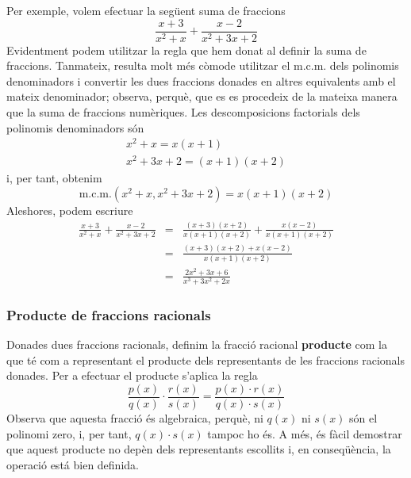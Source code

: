 Per exemple, volem efectuar la següent suma de fraccions\begin{equation*}
\frac{x+3}{x^{2}+x}+\frac{x-2}{x^{2}+3x+2}
\end{equation*}Evidentment podem utilitzar la regla que hem donat al definir la suma de
fraccions. Tanmateix, resulta molt més còmode utilitzar el m.c.m.
dels polinomis denominadors i convertir les dues fraccions donades en
altres equivalents amb el mateix denominador; observa, perquè, que es
es procedeix de la mateixa manera que la suma de fraccions numèriques. Les
descomposicions factorials dels polinomis denominadors són\begin{equation*}
\begin{array}{l}
x^{2}+x=x(x+1) \\
x^{2}+3x+2=(x+1)(x+2)\end{array}\end{equation*}i, per tant, obtenim\begin{equation*}
\text{m.c.m.}\left( x^{2}+x,x^{2}+3x+2\right) =x(x+1)(x+2)
\end{equation*}Aleshores, podem escriure\begin{eqnarray*}
\frac{x+3}{x^{2}+x}+\frac{x-2}{x^{2}+3x+2} &=&\frac{(x+3)(x+2)}{x(x+1)(x+2)}+\frac{x(x-2)}{x(x+1)(x+2)} \\
&=&\frac{(x+3)(x+2)+x(x-2)}{x(x+1)(x+2)} \\
&=&\frac{2x^{2}+3x+6}{x^{3}+3x^{2}+2x}
\end{eqnarray*}

\subsubsection{Producte de fraccions racionals}

Donades dues fraccions racionals, definim la fracció racional \textbf{producte} com la que té com a representant el producte dels
representants de les fraccions racionals donades. Per a efectuar el producte
s'aplica la regla\begin{equation*}
\frac{p(x)}{q(x)}\cdot \frac{r(x)}{s(x)}=\frac{p(x)\cdot r(x)}{q(x)\cdot s(x)}
\end{equation*}Observa que aquesta fracció és algebraica, perquè, ni $q(x)$ ni $s(x)$ són
el polinomi zero, i, per tant, $q(x)\cdot s(x)$ tampoc ho és. A més,
és fàcil demostrar que aquest producte no depèn dels representants
escollits i, en conseqüència, la operació está bien definida.

